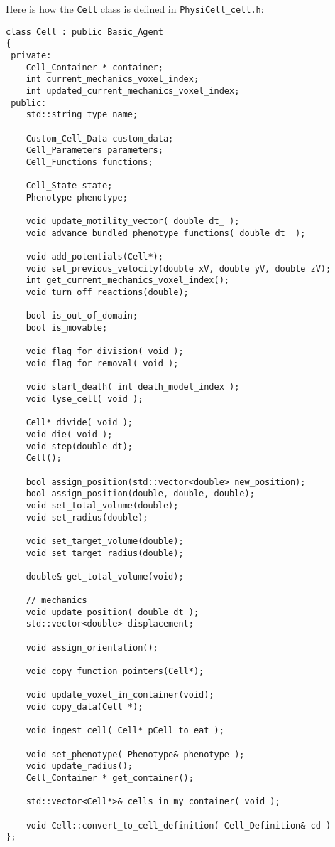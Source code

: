 \documentclass[12pt]{article}
\renewcommand{\v}{\verb}
\begin{document}
Here is how the \v|Cell| class is defined in 
\v|PhysiCell_cell.h|: 

\begin{verbatim}
class Cell : public Basic_Agent 
{
 private: 
    Cell_Container * container;
    int current_mechanics_voxel_index;
    int updated_current_mechanics_voxel_index; 
 public:
    std::string type_name; 
 
    Custom_Cell_Data custom_data;
    Cell_Parameters parameters;
    Cell_Functions functions; 
    
    Cell_State state; 
    Phenotype phenotype; 
    
    void update_motility_vector( double dt_ );
    void advance_bundled_phenotype_functions( double dt_ ); 
    
    void add_potentials(Cell*);
    void set_previous_velocity(double xV, double yV, double zV);
    int get_current_mechanics_voxel_index();
    void turn_off_reactions(double);  
    
    bool is_out_of_domain;
    bool is_movable;
    
    void flag_for_division( void );   
    void flag_for_removal( void );   
    
    void start_death( int death_model_index ); 
    void lyse_cell( void ); 

    Cell* divide( void );
    void die( void );
    void step(double dt);
    Cell();
    
    bool assign_position(std::vector<double> new_position);
    bool assign_position(double, double, double);
    void set_total_volume(double);
    void set_radius(double); 
    
    void set_target_volume(double); 
    void set_target_radius(double); 
    
    double& get_total_volume(void);
    
    // mechanics 
    void update_position( double dt );  
    std::vector<double> displacement; 

    void assign_orientation();  
    
    void copy_function_pointers(Cell*);
    
    void update_voxel_in_container(void);
    void copy_data(Cell *);
	
    void ingest_cell( Cell* pCell_to_eat ); 	

    void set_phenotype( Phenotype& phenotype );  
    void update_radius();
    Cell_Container * get_container();
    
    std::vector<Cell*>& cells_in_my_container( void ); 
    
    void Cell::convert_to_cell_definition( Cell_Definition& cd )
};
\end{verbatim}
\end{document}
